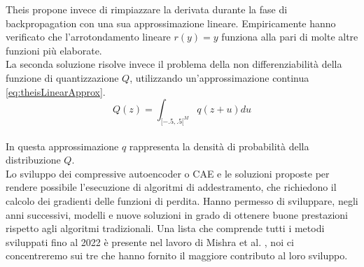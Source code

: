 Theis propone invece di rimpiazzare la derivata durante la fase di backpropagation con una sua approssimazione lineare. Empiricamente hanno verificato che l'arrotondamento lineare $r(y)=y$ funziona alla pari di molte altre funzioni più elaborate.\\
La seconda soluzione risolve invece il problema della non differenziabilità della funzione di quantizzazione $Q$, utilizzando un’approssimazione continua \ref{eq:theisLinearApprox}.\\
\begin{equation}\label{eq:theisLinearApprox}
    Q(z) = \int_{[-.5,.5[^{M}} q(z+u) du
\end{equation}\\
In questa approssimazione $q$ rappresenta la densità di probabilità della distribuzione $Q$.\\
Lo sviluppo dei compressive autoencoder o CAE e le soluzioni proposte per rendere possibile l’esecuzione di algoritmi di addestramento, che richiedono il calcolo dei gradienti delle funzioni di perdita. Hanno permesso di sviluppare, negli anni successivi, modelli e nuove soluzioni in grado di ottenere buone prestazioni rispetto agli algoritmi tradizionali. Una lista che comprende tutti i metodi sviluppati fino al 2022 è presente nel lavoro di Mishra et al. \cite{mishra2022deep}, noi ci concentreremo sui tre che hanno fornito il maggiore contributo al loro sviluppo.


